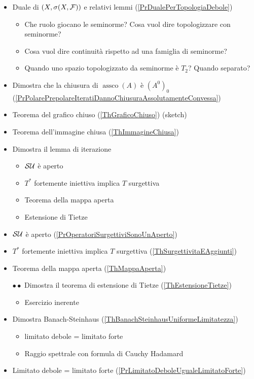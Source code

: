 \documentclass[a4paper]{report}
\DeclareMathOperator{\assco}{assco}
\begin{document}
\begin{itemize}
\item Duale di $(X,\sigma(X,\mathcal{F}))$ e relativi lemmi (\ref{PrDualePerTopologiaDebole})
\begin{itemize}
    \item Che ruolo giocano le seminorme? Cosa vuol dire topologizzare con seminorme?
    \item Cosa vuol dire continuit\`a rispetto ad una famiglia di seminorme?
    \item Quando uno spazio topologizzato da seminorme \`e $T_2$? Quando separato?
\end{itemize}
\item Dimostra che la chiusura di $\assco(A)$ \`e $(A^0)_0$ (\ref{PrPolarePrepolareIteratiDannoChiusuraAssolutamenteConvessa})
\item Teorema del grafico chiuso (\ref{ThGraficoChiuso}) (sketch)
\item Teorema dell'immagine chiusa (\ref{ThImmagineChiusa})
\item Dimostra il lemma di iterazione
\begin{itemize}
    \item $\mathcal{S}\mathcal{U}$ \`e aperto
    \item $T^\ast$ fortemente iniettiva implica $T$ surgettiva
    \item Teorema della mappa aperta
    \item Estensione di Tietze
\end{itemize}
\item $\mathcal{S}\mathcal{U}$ \`e aperto (\ref{PrOperatoriSurgettiviSonoUnAperto})
\item $T^\ast$ fortemente iniettiva implica $T$ surgettiva (\ref{ThSurgettivitaEAggiunti})
\item Teorema della mappa aperta (\ref{ThMappaAperta})
\item[$\bullet\bullet$] Dimostra il teorema di estensione di Tietze (\ref{ThEstensioneTietze})
\begin{itemize}
    \item Esercizio inerente
\end{itemize}
\item Dimostra Banach-Steinhaus (\ref{ThBanachSteinhausUniformeLimitatezza})
\begin{itemize}
    \item limitato debole = limitato forte
    \item Raggio spettrale con formula di Cauchy Hadamard
\end{itemize}
\item Limitato debole = limitato forte (\ref{PrLimitatoDeboleUgualeLimitatoForte})

\end{itemize}
\end{document}
